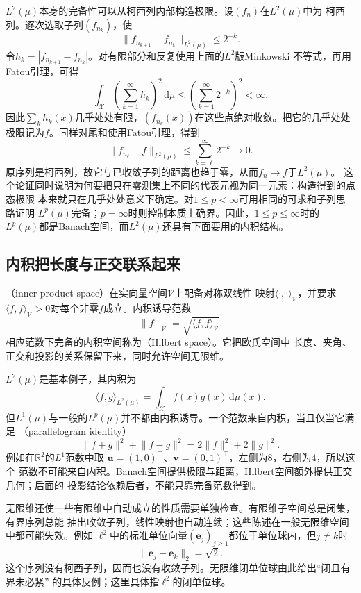 $L^2(\mu)$本身的完备性可以从柯西列内部构造极限。设$(f_n)$在$L^2(\mu)$中为
柯西列。逐次选取子列$(f_{n_k})$，使
\[
  \lVert f_{n_{k+1}}-f_{n_k}\rVert_{L^2(\mu)}
  \leq 2^{-k}.
\]
令$h_k=|f_{n_{k+1}}-f_{n_k}|$。对有限部分和反复使用上面的$L^2$版Minkowski
不等式，再用Fatou引理，可得
\[
  \int_{\mathcal{X}}
  \left(\sum_{k=1}^{\infty}h_k\right)^2
  \,\mathrm{d}\mu
  \leq
  \left(\sum_{k=1}^{\infty}2^{-k}\right)^2
  <\infty.
\]
因此$\sum_k h_k(x)$几乎处处有限，$(f_{n_k}(x))$在这些点绝对收敛。把它的几乎处处
极限记为$f$。同样对尾和使用Fatou引理，得到
\[
  \lVert f_{n_\ell}-f\rVert_{L^2(\mu)}
  \leq
  \sum_{k=\ell}^{\infty}2^{-k}
  \longrightarrow0.
\]
原序列是柯西列，故它与已收敛子列的距离也趋于零，从而$f_n\to f$于$L^2(\mu)$。
这个论证同时说明为何要把只在零测集上不同的代表元视为同一元素：构造得到的点态极限
本来就只在几乎处处意义下确定。对$1\leq p<\infty$可用相同的可求和子列思路证明
$L^p(\mu)$完备；$p=\infty$时则控制本质上确界。因此，$1\leq p\leq\infty$时的
$L^p(\mu)$都是Banach空间，而$L^2(\mu)$还具有下面要用的内积结构。

\subsection{内积把长度与正交联系起来}

（inner-product space）在实向量空间$\mathcal{V}$上配备对称双线性
映射$\langle\cdot,\cdot\rangle_{\mathcal{V}}$，并要求
$\langle f,f\rangle_{\mathcal{V}}>0$对每个非零$f$成立。内积诱导范数
\[
  \lVert f\rVert_{\mathcal{V}}
  =\sqrt{\langle f,f\rangle_{\mathcal{V}}}.
\]
相应范数下完备的内积空间称为（Hilbert space）。它把欧氏空间中
长度、夹角、正交和投影的关系保留下来，同时允许空间无限维。

$L^2(\mu)$是基本例子，其内积为
\[
  \langle f,g\rangle_{L^2(\mu)}
  =\int_{\mathcal{X}}f(x)g(x)\,\mathrm{d}\mu(x).
\]
但$L^1(\mu)$与一般的$L^p(\mu)$并不都由内积诱导。一个范数来自内积，当且仅当它满足
（parallelogram identity）
\begin{equation}
  \lVert f+g\rVert^2+\lVert f-g\rVert^2
  =
  2\lVert f\rVert^2+2\lVert g\rVert^2.
  \label{eq:functional-parallelogram-identity}
\end{equation}
例如在$\mathbb{R}^2$的$L^1$范数中取
$\bm{u}=(1,0)^{\top}$、$\bm{v}=(0,1)^{\top}$，左侧为$8$，右侧为$4$，所以这个
范数不可能来自内积。Banach空间提供极限与距离，Hilbert空间额外提供正交几何；后面的
投影结论依赖后者，不能只靠完备范数得到。

无限维还使一些有限维中自动成立的性质需要单独检查。有限维子空间总是闭集，有界序列总能
抽出收敛子列，线性映射也自动连续；这些陈述在一般无限维空间中都可能失效。例如
$\ell^2$中的标准单位向量$(\bm{e}_j)_{j\geq1}$都位于单位球内，但$j\neq k$时
\[
  \lVert\bm{e}_j-\bm{e}_k\rVert_2=\sqrt{2}.
\]
这个序列没有柯西子列，因而也没有收敛子列。无限维闭单位球由此给出“闭且有界未必紧”
的具体反例；这里具体指$\ell^2$的闭单位球。

